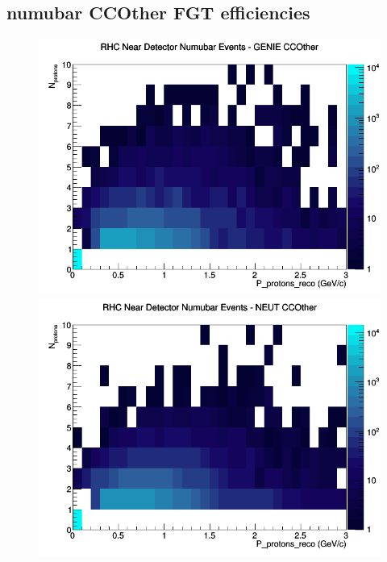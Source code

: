 \subsection{numubar CCOther FGT efficiencies}
\begin{figure}[h]
\includegraphics[width=\linewidth]{eff_N_P/FGT/protons/CCOther_RHC_ND_numubar_N_P_GENIE.png}
\endminipage
{}
\includegraphics[width=\linewidth]{eff_N_P/FGT/protons/CCOther_RHC_ND_numubar_N_P_NEUT.png}
\endminipage
{}

\end{figure}
